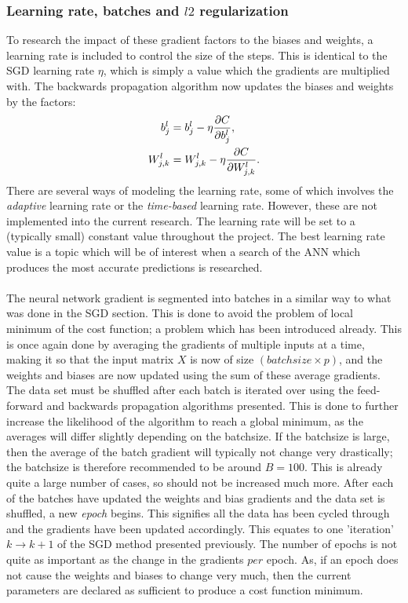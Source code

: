         \subsubsection{Learning rate, batches and $l2$ regularization}
            To research the impact of these gradient factors to the biases and weights, a learning rate is included to control the size of the steps. This is identical to the SGD learning rate $\eta$, which is simply a value which the gradients are multiplied with. The backwards propagation algorithm now updates the biases and weights by the factors:
            \begin{align}
                b^l_j &= b^l_j - \eta \pdv{C}{b^l_j}, \\
                W^l_{j,k} &= W^l_{j,k} - \eta \pdv{C}{W^l_{j,k}}.
            \end{align}
            There are several ways of modeling the learning rate, some of which involves the \textit{adaptive} learning rate or the \textit{time-based} learning rate. However, these are not implemented into the current research. The learning rate will be set to a (typically small) constant value throughout the project. The best learning rate value is a topic which will be of interest when a search of the ANN which produces the most accurate predictions is researched.\\\\
            The neural network gradient is segmented into batches in a similar way to what was done in the SGD section. This is done to avoid the problem of local minimum of the cost function; a problem which has been introduced already. This is once again done by averaging the gradients of multiple inputs at a time, making it so that the input matrix $X$ is now of size $(batchsize \times p)$, and the weights and biases are now updated using the sum of these average gradients. The data set must be shuffled after each batch is iterated over using the feed-forward and backwards propagation algorithms presented. This is done to further increase the likelihood of the algorithm to reach a global minimum, as the averages will differ slightly depending on the batchsize. If the batchsize is large, then the average of the batch gradient will typically not change very drastically; the batchsize is therefore recommended to be around $B=100$. This is already quite a large number of cases, so should not be increased much more. After each of the batches have updated the weights and bias gradients and the data set is shuffled, a new \textit{epoch} begins. This signifies all the data has been cycled through and the gradients have been updated accordingly. This equates to one 'iteration' $k\rightarrow k+1$ of the SGD method presented previously. The number of epochs is not quite as important as the change in the gradients $per$ epoch. As, if an epoch does not cause the weights and biases to change very much, then the current parameters are declared as sufficient to produce a cost function minimum.\\\\
